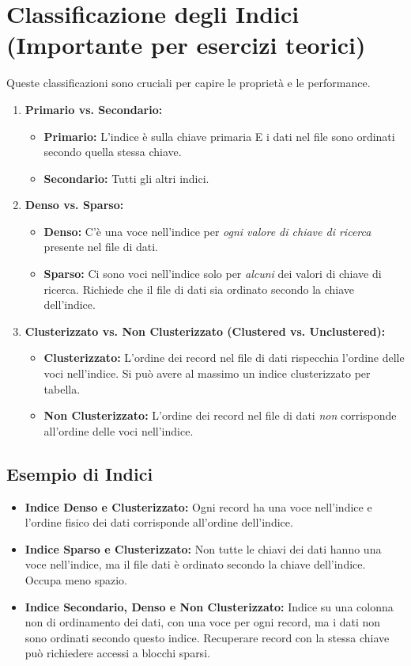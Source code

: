\section{Classificazione degli Indici (Importante per esercizi teorici)}
Queste classificazioni sono cruciali per capire le proprietà e le performance.
\begin{enumerate}
    \item \textbf{Primario vs. Secondario:}
    \begin{itemize}
        \item \textbf{Primario:} L'indice è sulla chiave primaria E i dati nel file sono ordinati secondo quella stessa chiave.
        \item \textbf{Secondario:} Tutti gli altri indici.
    \end{itemize}

    \item \textbf{Denso vs. Sparso:}
    \begin{itemize}
        \item \textbf{Denso:} C'è una voce nell'indice per \textit{ogni valore di chiave di ricerca} presente nel file di dati.
        \item \textbf{Sparso:} Ci sono voci nell'indice solo per \textit{alcuni} dei valori di chiave di ricerca. Richiede che il file di dati sia ordinato secondo la chiave dell'indice.
    \end{itemize}

    \item \textbf{Clusterizzato vs. Non Clusterizzato (Clustered vs. Unclustered):}
    \begin{itemize}
        \item \textbf{Clusterizzato:} L'ordine dei record nel file di dati rispecchia l'ordine delle voci nell'indice. Si può avere al massimo un indice clusterizzato per tabella.
        \item \textbf{Non Clusterizzato:} L'ordine dei record nel file di dati \textit{non} corrisponde all'ordine delle voci nell'indice.
    \end{itemize}
\end{enumerate}

\subsection{Esempio di Indici}
\begin{itemize}
    \item \textbf{Indice Denso e Clusterizzato:} Ogni record ha una voce nell'indice e l'ordine fisico dei dati corrisponde all'ordine dell'indice.
    \item \textbf{Indice Sparso e Clusterizzato:} Non tutte le chiavi dei dati hanno una voce nell'indice, ma il file dati è ordinato secondo la chiave dell'indice. Occupa meno spazio.
    \item \textbf{Indice Secondario, Denso e Non Clusterizzato:} Indice su una colonna non di ordinamento dei dati, con una voce per ogni record, ma i dati non sono ordinati secondo questo indice. Recuperare record con la stessa chiave può richiedere accessi a blocchi sparsi.
\end{itemize}

